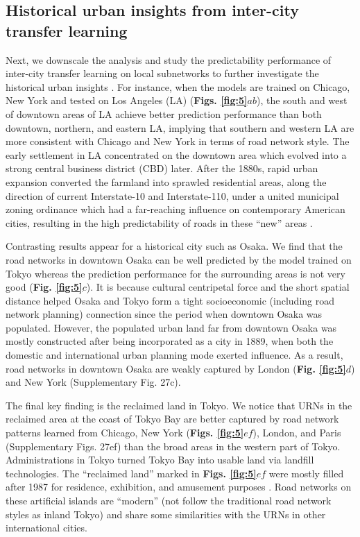 \documentclass[10pt]{wlscirep}
\begin{document}
\subsection*{Historical urban insights from inter-city transfer learning}
Next, we downscale the analysis and study the predictability performance of inter-city transfer learning on local subnetworks to further investigate the historical urban insights \cite{ortman2014pre}. For instance, when the models are trained on Chicago, New York and tested on Los Angeles (LA) (\textbf{Figs. \ref{fig:5}$ab$}), the south and west of downtown areas of LA achieve better prediction performance than both downtown, northern, and eastern LA, implying that southern and western LA are more consistent with Chicago and New York in terms of road network style. The early settlement in LA concentrated on the downtown area which evolved into a strong central business district (CBD) later. After the 1880s, rapid urban expansion converted the farmland into sprawled residential areas, along the direction of current Interstate-10 and Interstate-110, under a united municipal zoning ordinance which had a far-reaching influence on contemporary American cities, resulting in the high predictability of roads in these “new” areas \cite{whittemore2012zoning}. 

Contrasting results appear for a historical city such as Osaka. We find that the road networks in downtown Osaka can be well predicted by the model trained on Tokyo whereas the prediction performance for the surrounding areas is not very good (\textbf{Fig. \ref{fig:5}$c$}). It is because cultural centripetal force and the short spatial distance helped Osaka and Tokyo form a tight socioeconomic (including road network planning) connection since the period when downtown Osaka was populated. However, the populated urban land far from downtown Osaka was mostly constructed after being incorporated as a city in 1889, when both the domestic and international urban planning mode exerted influence. As a result, road networks in downtown Osaka are weakly captured by London (\textbf{Fig. \ref{fig:5}$d$}) and New York (Supplementary Fig. 27c).

The final key finding is the reclaimed land in Tokyo. We notice that URNs in the reclaimed area at the coast of Tokyo Bay are better captured by road network patterns learned from Chicago, New York (\textbf{Figs. \ref{fig:5}$ef$}), London, and Paris (Supplementary Figs. 27ef) than the broad areas in the western part of Tokyo. Administrations in Tokyo turned Tokyo Bay into usable land via landfill technologies. The “reclaimed land” marked in \textbf{Figs. \ref{fig:5}$ef$} were mostly filled after 1987 for residence, exhibition, and amusement purposes \cite{endoh2004historical}. Road networks on these artificial islands are “modern” (not follow the traditional road network styles as inland Tokyo) and share some similarities with the URNs in other international cities. 
\end{document}
